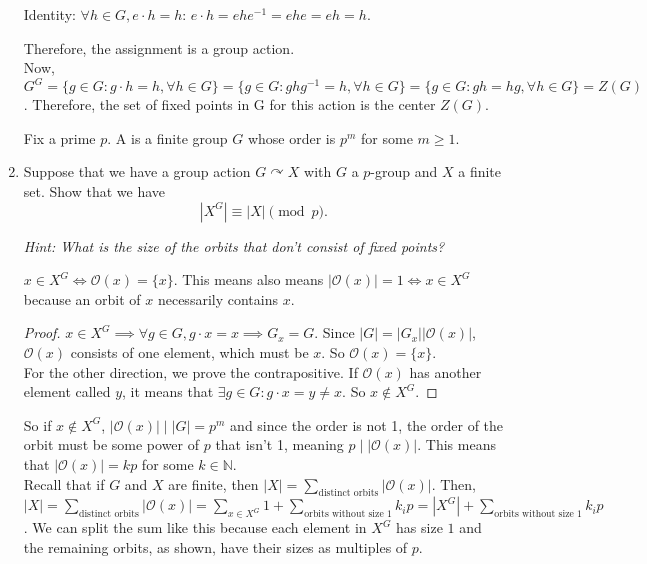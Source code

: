 \documentclass{amsart}
\begin{document}
\begin{enumerate}
Identity: $\forall h\in G,e\cdot h=h$: $e\cdot h=ehe^{-1}=ehe=eh=h$.

Therefore, the assignment is a group action.\\

Now, $G^G=\{g\in G:g\cdot h=h,\forall h\in G\}=\{g\in G:ghg^{-1}=h,\forall h\in G\}=\{g\in G:gh=hg,\forall h\in G\}=Z(G)$. Therefore, the set of fixed points in G for this action is the center $Z(G)$.


\vspace{0.2in}

Fix a prime $p$. A  is a finite group $G$ whose order is $p^m$ for some $m\ge 1$.

\item  Suppose that we have a group action $G\curvearrowright X$ with $G$ a $p$-group and $X$ a finite set. Show that we have
\[
|X^G|\equiv |X|\pmod{p}.
\]


\emph{Hint: What is the size of the orbits that \emph{don't} consist of fixed points?}


\begin{lemma}
    $x\in X^G\iff\mathcal{O}(x)=\{x\}$. This means also means $|\mathcal O(x)|=1\iff x\in X^G$ because an orbit of $x$ necessarily contains $x$.
\end{lemma}

\begin{proof}
    $x\in X^G\implies\forall g\in G,g\cdot x=x\implies G_x=G$. Since $|G|=|G_x||\mathcal O(x)|$, $\mathcal{O}(x)$ consists of one element, which must be $x$. So $\mathcal O(x)=\{x\}$.\\

    For the other direction, we prove the contrapositive. If $\mathcal O(x)$ has another element called $y$, it means that $\exists g\in G:g\cdot x=y\neq x$. So $x\notin X^G$.
    
\end{proof}

So if $x\notin X^G$, $|\mathcal O(x)|\mid|G|=p^m$ and since the order is not 1, the order of the orbit must be some power of $p$ that isn't 1, meaning $p\mid|\mathcal O(x)|$. This means that $|\mathcal O(x)|=kp$ for some $k\in\mathbb N$.\\

Recall that if $G$ and $X$ are finite, then $|X|=\sum_{\text{distinct orbits}}|\mathcal O(x)|$. Then, $|X|=\sum_{\text{distinct orbits}}|\mathcal O(x)|=\sum_{x\in X^G}1+\sum_{\text{orbits without size 1}}k_ip=|X^G|+\sum_{\text{orbits without size 1}}k_ip$. We can split the sum like this because each element in $X^G$ has size $1$ and the remaining orbits, as shown, have their sizes as multiples of $p$.\\


\end{enumerate}
\end{document}
